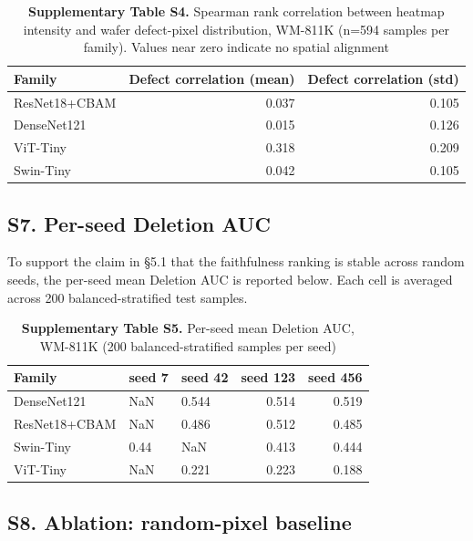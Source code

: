 \documentclass[11pt,a4paper]{article}
\begin{document}
\begin{table}[htbp]
\centering
\small
\caption{\textbf{Supplementary Table S4.} Spearman rank correlation between heatmap intensity and wafer defect-pixel distribution, WM-811K (n=594 samples per family). Values near zero indicate no spatial alignment}
\begin{tabular}{lrr}
\toprule
Family & Defect correlation (mean) & Defect correlation (std) \\
\midrule
ResNet18+CBAM & 0.037 & 0.105 \\
DenseNet121 & 0.015 & 0.126 \\
ViT-Tiny & 0.318 & 0.209 \\
Swin-Tiny & 0.042 & 0.105 \\
\bottomrule
\end{tabular}
\end{table}



\subsection*{S7. Per-seed Deletion AUC}

To support the claim in \S{}5.1 that the faithfulness ranking is stable across random seeds, the per-seed mean Deletion AUC is reported below. Each cell is averaged across 200 balanced-stratified test samples.


\begin{table}[htbp]
\centering
\small
\caption{\textbf{Supplementary Table S5.} Per-seed mean Deletion AUC, WM-811K (200 balanced-stratified samples per seed)}
\begin{tabular}{lllrr}
\toprule
Family & seed 7 & seed 42 & seed 123 & seed 456 \\
\midrule
DenseNet121 & NaN & 0.544 & 0.514 & 0.519 \\
ResNet18+CBAM & NaN & 0.486 & 0.512 & 0.485 \\
Swin-Tiny & 0.44 & NaN & 0.413 & 0.444 \\
ViT-Tiny & NaN & 0.221 & 0.223 & 0.188 \\
\bottomrule
\end{tabular}
\end{table}



\subsection*{S8. Ablation: random-pixel baseline}
\end{document}
